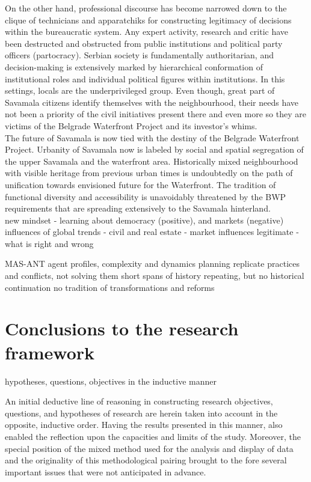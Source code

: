 \documentclass[11pt]{report}
\begin{document}
{On the other hand, professional discourse has become narrowed down to the clique of technicians and apparatchiks for constructing legitimacy of decisions within the bureaucratic system. 
Any expert activity, research and critic have been destructed and obstructed from public institutions and political party officers (partocracy).
Serbian society is fundamentally authoritarian, and decision-making is extensively marked by hierarchical conformation of institutional roles and individual political figures within institutions.
In this settings, locals are the underprivileged group.
Even though, great part of Savamala citizens identify themselves with the neighbourhood, their needs have not been a priority of the civil initiatives  present there and even more so they are victims of the Belgrade Waterfront Project and its investor's whims.
\\

The future of Savamala is now tied with the destiny of the Belgrade Waterfront Project.
Urbanity of Savamala now is labeled by social and spatial segregation of the upper Savamala and the waterfront area.
Historically mixed neighbourhood with visible heritage from previous urban times is undoubtedly on the path of unification towards envisioned future for the Waterfront.
The tradition of functional diversity and accessibility is unavoidably threatened by the BWP requirements that are spreading extensively to the Savamala hinterland.
\\

new mindset - learning about democracy (positive), and markets (negative)
influences of global trends - civil and real estate - market influences
legitimate - what is right and wrong

MAS-ANT agent profiles, complexity and dynamics
planning replicate practices and conflicts, not solving them
short spans of history repeating, but no historical continuation
no tradition of transformations and reforms

\section{Conclusions to the research framework}

hypotheses, questions, objectives in the inductive manner

An initial deductive line of reasoning in constructing research objectives, questions, and hypotheses of research are herein taken into account in the opposite, inductive order.
Having the results presented in this manner, also enabled the reflection upon the capacities and limits of the study.
Moreover, the special position of the mixed method used for the analysis and display of data and the originality of this methodological pairing brought to the fore several important issues that were not anticipated in advance.

}
\end{document}
